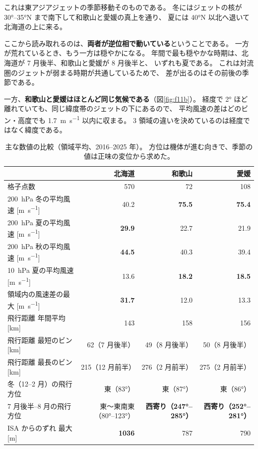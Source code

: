 これは東アジアジェットの季節移動そのものである。
冬にはジェットの核が \ang{30}--\ang{35}N まで南下して和歌山と愛媛の真上を通り、
夏には \ang{40}N 以北へ退いて北海道の上に来る。

ここから読み取れるのは、\textbf{両者が逆位相で動いている}ということである。
一方が荒れているとき、もう一方は穏やかになる。
年間で最も穏やかな時期は、北海道が 7 月後半、和歌山と愛媛が 8 月後半と、
いずれも夏である。
これは対流圏のジェットが弱まる時期が共通しているためで、
差が出るのはその前後の季節である。

一方、\textbf{和歌山と愛媛はほとんど同じ気候である}（図\ref{fig:f11b}）。
経度で \ang{2} ほど離れていても、同じ緯度帯のジェットの下にあるので、
平均風速の差はどのビン・高度でも \SI{1.7}{\metre\per\second} 以内に収まる。
3 領域の違いを決めているのは経度ではなく緯度である。

\begin{table}[H]
\centering
\caption{主な数値の比較（領域平均、2016--2025 年）。
方位は機体が進む向きで、季節の値は正味の変位から求めた。}
\label{tab:compare}
\small
\begin{tabular}{lrrr}
\toprule
 & 北海道 & 和歌山 & 愛媛 \\
\midrule
格子点数 & 570 & 72 & 108 \\
\SI{200}{\hecto\pascal} 冬の平均風速 [\si{\metre\per\second}] & 40.2 & \textbf{75.5} & \textbf{75.4} \\
\SI{200}{\hecto\pascal} 夏の平均風速 [\si{\metre\per\second}] & \textbf{29.9} & 22.7 & 21.9 \\
\SI{200}{\hecto\pascal} 秋の平均風速 [\si{\metre\per\second}] & \textbf{44.5} & 40.3 & 39.4 \\
\SI{10}{\hecto\pascal} 夏の平均風速 [\si{\metre\per\second}] & 13.6 & \textbf{18.2} & \textbf{18.5} \\
領域内の風速差の最大 [\si{\metre\per\second}] & \textbf{31.7} & 12.0 & 13.3 \\
飛行距離 年間平均 [\si{\kilo\metre}] & 143 & 158 & 156 \\
飛行距離 最短のビン [\si{\kilo\metre}] & 62（7 月後半） & 49（8 月後半） & 50（8 月後半） \\
飛行距離 最長のビン [\si{\kilo\metre}] & 215（12 月前半） & 276（2 月前半） & 275（2 月前半） \\
冬（12--2 月）の飛行方位 & 東（\ang{83}） & 東（\ang{87}） & 東（\ang{86}） \\
7 月後半--8 月の飛行方位 & 東〜東南東（\ang{80}--\ang{123}） & \textbf{西寄り（\ang{247}--\ang{285}）} & \textbf{西寄り（\ang{252}--\ang{281}）} \\
ISA からのずれ 最大 [\si{\metre}] & \textbf{1036} & 787 & 790 \\
\bottomrule
\end{tabular}
\end{table}


